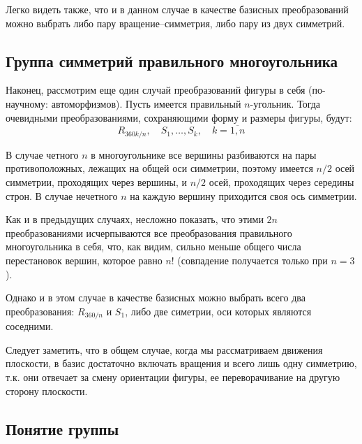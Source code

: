 Легко видеть также, что и в данном случае в качестве базисных преобразований можно выбрать либо пару вращение--симметрия, либо пару из двух симметрий.



\subsection{Группа симметрий правильного многоугольника}

Наконец, рассмотрим еще один случай преобразований фигуры в себя (по-научному: автоморфизмов). Пусть имеется правильный $n$-угольник. Тогда очевидными преобразованиями, сохраняющими форму и размеры фигуры, будут:
$$
R_{360k/n},\quad S_1,\dots, S_k,\quad k=\overline{1,n}
$$

В случае четного $n$ в многоугольнике все вершины разбиваются на пары противоположных, лежащих на общей оси симметрии, поэтому имеется $n/2$ осей симметрии, проходящих через вершины, и $n/2$ осей, проходящих через середины строн. В случае нечетного $n$ на каждую вершину приходится своя ось симметрии.

Как и в предыдущих случаях, несложно показать, что этими $2n$ преобразованиями исчерпываются все преобразования правильного многоугольника в себя, что, как видим, сильно меньше общего числа перестановок вершин, которое равно $n!$ (совпадение получается только при $n=3$).

Однако и в этом случае в качестве базисных можно выбрать всего два преобразования: $R_{360/n}$ и $S_1$, либо две симетрии, оси которых являются соседними.

Следует заметить, что в общем случае, когда мы рассматриваем движения плоскости, в базис достаточно включать вращения и всего лишь одну симметрию, т.к. они отвечает за смену ориентации фигуры, ее переворачивание на другую сторону плоскости.



\subsection{Понятие группы}

